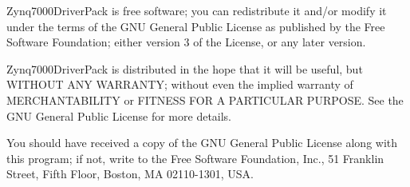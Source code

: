 Zynq7000\+Driver\+Pack is free software; you can redistribute it and/or modify it under the terms of the G\+N\+U General Public License as published by the Free Software Foundation; either version 3 of the License, or any later version.

Zynq7000\+Driver\+Pack is distributed in the hope that it will be useful, but W\+I\+T\+H\+O\+U\+T A\+N\+Y W\+A\+R\+R\+A\+N\+T\+Y; without even the implied warranty of M\+E\+R\+C\+H\+A\+N\+T\+A\+B\+I\+L\+I\+T\+Y or F\+I\+T\+N\+E\+S\+S F\+O\+R A P\+A\+R\+T\+I\+C\+U\+L\+A\+R P\+U\+R\+P\+O\+S\+E. See the G\+N\+U General Public License for more details.

You should have received a copy of the G\+N\+U General Public License along with this program; if not, write to the Free Software Foundation, Inc., 51 Franklin Street, Fifth Floor, Boston, M\+A 02110-\/1301, U\+S\+A. 